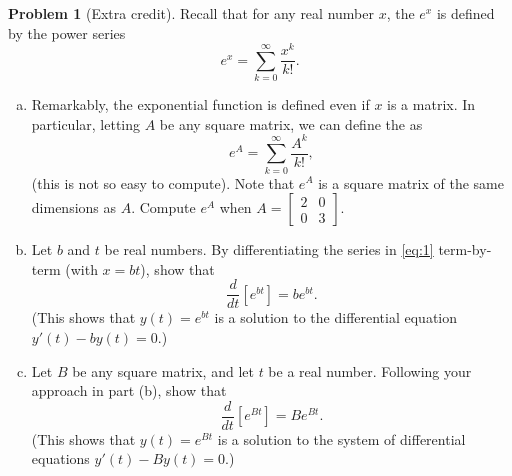 \documentclass[10pt]{article}
\theoremstyle{definition}
\newtheorem{problem}[theorem]{Problem}
\newcommand{\1}[1]{\textbf{1}_{\left[#1\right]}} %
\newcommand{\dempfcolor}[1]{{\color{RoyalBlue}#1}}
\newcommand{\demph}[1]{\dempfcolor{{\sl #1}}}
\begin{document}
\begin{problem}[Extra credit]
  Recall that for any real number $x$, the \demph{exponential function}
  $e^{x}$ is defined by the power series
  \begin{equation}\label{eq:1}
    e^{x} = \sum_{k=0}^{\infty}\frac{x^{k}}{k!}.
  \end{equation}
  \begin{enumerate}[(a)]
    \item Remarkably, the exponential function is defined even if $x$ is a
    matrix. In particular, letting $A$ be any square matrix, we can define the
    \demph{matrix exponential} as
    \begin{equation*}
      e^{A} = \sum_{k=0}^{\infty} \frac{A^{k}}{k!},
    \end{equation*}
    (this is not so easy to compute). Note that $e^{A}$ is a square matrix of
    the same dimensions as $A$. Compute $e^{A}$ when $A =
    \begin{bmatrix}
      2&0\\
      0&3
    \end{bmatrix}
    $. 
    \item Let $b$ and $t$ be real numbers. By differentiating the series in
    \cref{eq:1} term-by-term (with $x=bt$), show that
    \begin{equation*}
      \frac{d}{dt} \left[ e^{bt}  \right] = b e^{bt}.
    \end{equation*}
    (This shows that $y(t)=e^{bt}$ is a solution to the differential equation $y'(t)-by(t)=0$.)
    \item Let $B$ be any square matrix, and let $t$ be a real number.
    Following your approach in part (b), show that
    \begin{equation*}
      \frac{d}{dt} \left[ e^{Bt} \right]  = B e^{Bt}.
    \end{equation*}
    (This shows that $y(t)=e^{Bt}$ is a solution to the system of differential equations $y'(t)-By(t)=0$.)
  \end{enumerate}
\end{problem}
\end{document}
